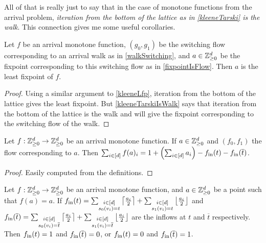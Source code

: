   All of that is really just to say that in the case of monotone functions from the arrival problem,
  \emph{iteration from the bottom of the lattice as in \cref{kleeneTarski} is the walk}. This connection gives
  me some useful corollaries.
  \begin{cor}\label{walkLfp}
    Let $f$ be an arrival monotone function, 
    $(g_0, g_1)$ be the switching flow corresponding to an arrival walk as in \cref{walkSwitching},
    and $a \in \mathbb{Z}_{\geq 0}^d$ be the fixpoint corresponding to this switching flow as in \cref{fixpointIsFlow}.
    Then $a$ is the least fixpoint of $f$.
  \end{cor}
  \begin{proof}
    Using a similar argument to \cref{kleeneLfp}, iteration from the bottom of the lattice gives the least
    fixpoint. But \cref{kleeneTarskiIsWalk} says that iteration from the bottom of the lattice is the walk
    and will give the fixpoint corresponding to the switching flow of the walk.
  \end{proof}
  \begin{lemma} \label{flowSunk}
    Let $f : \mathbb{Z}_{\geq 0}^d \to \mathbb{Z}_{\geq 0}^d$ be an arrival monotone function. If $a \in \mathbb{Z}_{\geq 0}^d$ and
    $(f_0, f_1)$ the flow corresponding to $a$. Then 
    $\sum_{i \in [d]} f(a)_i =  1 + \left( \sum_{i \in [d]} a_i \right) - f_{\text{in}}(t) - f_{\text{in}}(\overline{t})$.
  \end{lemma}
  \begin{proof}
    Easily computed from the definitions.
  \end{proof}
  \begin{cor}
    Let $f : \mathbb{Z}_{\geq 0}^d \to \mathbb{Z}_{\geq 0}^d$ be an arrival monotone function, and $a \in \mathbb{Z}_{\geq 0}^d$ be a point
    such that $f(a) = a$. If 
    $f_{\text{in}} (t) = \sum_{\substack{i \in [d] \\ s_0(v_i) = t}}  \left\lceil \frac{a_i}{2} \right\rceil +
    \sum_{\substack{i \in [d] \\ s_1(v_i) = t}}  \left\lfloor \frac{a_i}{2} \right\rfloor$ and
    $f_{\text{in}}(\overline{t}) = \sum_{\substack{i \in [d] \\ s_0(v_i) = \overline{t}}}  \left\lceil \frac{a_i}{2} \right\rceil +
    \sum_{\substack{i \in [d] \\ s_1(v_i) = \overline{t}}}  \left\lfloor \frac{a_i}{2} \right\rfloor$ are the inflows at $t$ and $\overline{t}$
    respectively. Then $f_{\text{in}} (t) = 1$ and $f_{\text{in}} (\overline{t}) = 0$,
    or $f_{\text{in}} (t) = 0$ and $f_{\text{in}} (\overline{t}) = 1$.
  \end{cor}

